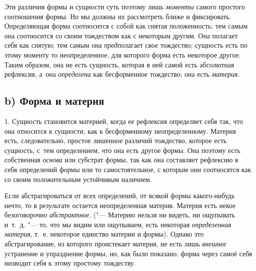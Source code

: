 Эти различия формы и сущности суть поэтому лишь {\em моменты} самого простого
соотношения формы. Но мы должны их рассмотреть ближе и фиксировать.
Определяющая форма соотносится с собой как снятая положенность; тем самым она
соотносится со своим тождеством как с некоторым другим. Она полагает себя как
снятую; тем самым она {\em пред}полагает свое тождество; сущность есть по этому
моменту то неопределенное, для которого форма есть некоторое другое. Таким
образом, она не есть сущность, которая в ней самой есть абсолютная рефлексия,
а~она {\em определена} как бесформенное тождество; она есть {\em материя}.

\subsection[b) Форма и материя]{b) Форма и материя}

1. Сущность становится материей, когда ее рефлексия определяет себя так, что
она относится к сущности, как к бесформенному неопределенному. Материя есть,
следовательно, простое лишенное различий тождество, которое есть сущность,
с~тем определением, что она есть другое формы. Она поэтому есть собственная
{\em основа} или субстрат формы, так как она составляет рефлексию в себя
определений формы или то самостоятельное, с которым они соотносятся как со
своим положительным устойчивым наличием.

Если абстрагироваться от всех определений, от всякой формы какого-нибудь нечто,
то в результате остается неопределенная материя. Материя есть некое
безоговорочно {\em абстрактное}. ("--- Материю нельзя ни видеть, ни ощупывать
и~т.~д. "--- то, что мы видим или ощупываем, есть некоторая {\em определенная
материя}, т.~е. некоторое единство материи и формы). Однако это
абстрагирование, из которого проистекает материя, не есть лишь {\em внешнее}
устранение и упразднение формы, но, как было показано, форма через самоё себя
низводит себя к этому простому тождеству.

